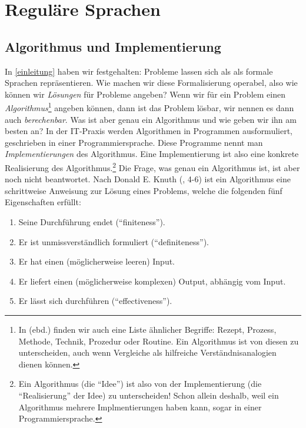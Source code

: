 \chapter{Reguläre Sprachen}\label{reg}

\section{Algorithmus und Implementierung}\label{algoundimpl}

In \autoref{einleitung} haben wir festgehalten:
Probleme lassen sich als als formale Sprachen repräsentieren.
Wie machen wir diese Formalisierung operabel,
also wie können wir \emph{Lösungen} für Probleme angeben?
Wenn wir für ein Problem einen \emph{Algorithmus}\footnote{
    In \cite{knuth1} (ebd.) finden wir auch eine Liste ähnlicher Begriffe:
    Rezept, Prozess, Methode, Technik, Prozedur oder Routine.
    Ein Algorithmus ist von diesen zu unterscheiden,
    auch wenn Vergleiche als hilfreiche Verständnisanalogien dienen können.
}
angeben können, dann ist das Problem lösbar,
wir nennen es dann auch \emph{berechenbar}.
Was ist aber genau ein Algorithmus und wie geben wir ihn am besten an?
In der IT-Praxis werden Algorithmen in Programmen ausformuliert,
geschrieben in einer Programmiersprache.
Diese Programme nennt man \emph{Implementierungen} des Algorithmus.
Eine Implementierung ist also eine konkrete Realisierung des Algorithmus.\footnote{
    Ein Algorithmus (die ``Idee'') ist also von
    der Implementierung (die ``Realisierung'' der Idee) zu unterscheiden!
    Schon allein deshalb,
    weil ein Algorithmus mehrere Implmentierungen haben kann,
    sogar in einer Programmiersprache.}
Die Frage, was genau ein Algorithmus ist, ist aber noch nicht beantwortet.
Nach Donald E. Knuth (\cite{knuth1}, 4-6)
ist ein Algorithmus eine schrittweise Anweisung zur Lösung eines Problems,
welche die folgenden fünf Eigenschaften erfüllt:
\begin{enumerate}
    \item Seine Durchführung endet (``finiteness'').
    \item Er ist unmissverständlich formuliert (``definiteness'').
    \item Er hat einen (möglicherweise leeren) Input.
    \item Er liefert einen (möglicherweise komplexen) Output, abhängig vom Input.
    \item Er lässt sich durchführen (``effectiveness'').
\end{enumerate}


